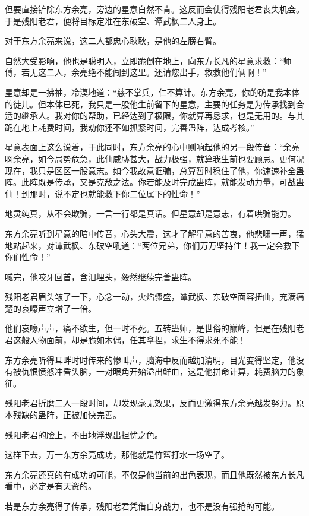 \begin{this_body}
但要直接铲除东方余亮，旁边的星意自然不肯。这反而会使得残阳老君丧失机会。于是残阳老君，便将目标定准在东破空、谭武枫二人身上。

对于东方余亮来说，这二人都忠心耿耿，是他的左膀右臂。

自然大受影响，他也是聪明人，立即跪倒在地上，向东方长凡的星意求救：“师傅，若无这二人，余亮绝不能闯到这里。还请您出手，救救他们俩啊！”

星意却是一拂袖，冷漠地道：“慈不掌兵，仁不算计。东方余亮，你的确是我本体的徒儿。但本体已死，我只是一股他生前留下的星意，主要的任务是为传承找到合适的继承人。我对你的帮助，已经达到了极限，你就算再恳求，也是无用的。与其跪在地上耗费时间，我劝你还不如抓紧时间，完善蛊阵，达成考核。”

星意表面上这么说着，于此同时，东方余亮的心中则响起他的另一段传音：“余亮啊余亮，如今局势危急，此仙威胁甚大，战力极强，就算我生前也要顾忌。更何况现在，我只是区区一股意志。如今我故意诓骗，总算暂时稳住了他，你速速补全蛊阵。此阵既是传承，又是克敌之法。你若能及时完成蛊阵，就能发动力量，可战蛊仙！到那时，说不定也就能救下你二位属下的性命！”

地灵纯真，从不会欺骗，一言一行都是真话。但星意却是意志，有着哄骗能力。

东方余亮听到星意的暗中传音，心头大震，这才了解星意的苦衷，他悲啸一声，猛地站起来，对谭武枫、东破空吼道：“两位兄弟，你们万万坚持住！我一定会救下你们性命！”

喊完，他咬牙回首，含泪埋头，毅然继续完善蛊阵。

残阳老君眉头皱了一下，心念一动，火焰骤盛，谭武枫、东破空面容扭曲，充满痛楚的哀嚎声立增了一倍。

他们哀嚎声声，痛不欲生，但一时不死。五转蛊师，是世俗的巅峰，但是在残阳老君这般人物面前，却是脆如木偶，任其拿捏，求生不得求死不能！

东方余亮听得耳畔时时传来的惨叫声，脑海中反而越加清明，目光变得坚定，他没有被仇恨愤怒冲昏头脑，一对眼角开始溢出鲜血，这是他拼命计算，耗费脑力的象征。

残阳老君折磨二人一段时间，却发现毫无效果，反而更激得东方余亮越发努力。原本残缺的蛊阵，正被加快完善。

残阳老君的脸上，不由地浮现出担忧之色。

这样下去，万一东方余亮成功，那他就是竹篮打水一场空了。

东方余亮还真的有成功的可能，不仅是他当前的出色表现，而且他既然被东方长凡看中，必定是有天资的。

若是东方余亮得了传承，残阳老君凭借自身战力，也不是没有强抢的可能。


\end{this_body}
